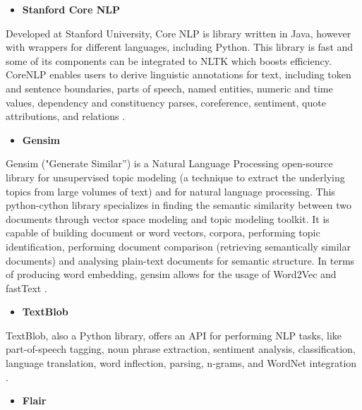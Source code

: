         \begin{itemize}
            \item\textbf{Stanford Core NLP}
        \end{itemize}
      

        \par Developed at Stanford University, Core NLP is library written in Java, however with wrappers for different languages, including Python. This library is fast and some of its components can be integrated to NLTK which boosts efficiency. CoreNLP enables users to derive linguistic annotations for text, including token and sentence boundaries, parts of speech, named entities, numeric and time values, dependency and constituency parses, coreference, sentiment, quote attributions, and relations \cite{Manning2015}.

        \begin{itemize}
            \item\textbf{Gensim}
        \end{itemize}

    

        \par Gensim ("Generate Similar”) is a Natural Language Processing open-source library for unsupervised topic modeling (a technique to extract the underlying topics from large volumes of text)  and for natural language processing. This python-cython library specializes in finding the semantic similarity between two documents through vector space modeling and topic modeling toolkit. It is capable of building document or word vectors, corpora, performing topic identification, performing document comparison (retrieving semantically similar documents) and analysing plain-text documents for semantic structure. In terms of producing word embedding, gensim allows for the usage of Word2Vec and fastText \cite{rehurek_lrec}.
        
        \begin{itemize}
            \item\textbf{TextBlob}
        \end{itemize}

     

        TextBlob, also a Python library,  offers an API for performing NLP tasks, like part-of-speech tagging, noun phrase extraction, sentiment analysis, classification, language translation, word inflection, parsing, n-grams, and WordNet integration \cite{textblob}.

        \begin{itemize}
            \item\textbf{Flair}
        \end{itemize}
   

